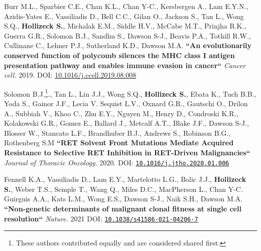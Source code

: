 {Burr M.L., Sparbier C.E., Chan K.L., Chan Y-C., Kersbergen A., Lam E.Y.N., Azidis-Yates E., Vassiliadis D., Bell C.C., Gilan O., Jackson S., Tan L., Wong S.Q., \textbf{Hollizeck S.}, Michalak E.M., Siddle H.V.,  McCabe M.T., Prinjha R.K., Guerra G.R., Solomon B.J., Sandhu S.,  Dawson S-J., Beavis P.A., Tothill R.W., Cullinane C., Lehner P.J., Sutherland K.D., Dawson M.A. \textbf{``An evolutionarily conserved function of polycomb silences the MHC class I antigen presentation pathway and enables immune evasion in cancer``} \textit{Cancer cell.} 2019. DOI: \href{https://doi.org/10.1016/j.ccell.2019.08.008}{10.1016/j.ccell.2019.08.008}

Solomon B.J.\footnote{These authors contributed equally and are considered shared first.}., Tan L.\footnotemark[\value{footnote}], Lin J.J.\footnotemark[\value{footnote}], Wong S.Q.\footnotemark[\value{footnote}], \textbf{Hollizeck S.}\footnotemark[\value{footnote}], Ebata K., Tuch B.B., Yoda S., Gainor J.F., Lecia V. Sequist L.V., Oxnard G.R., Gautschi O., Drilon A., Subbiah V., Khoo C., Zhu E.Y., Nguyen M., Henry D., Condroski K.R., Kolakowski G.R., Gomez E., Ballard J., Metcalf A.T., Blake J.F., Dawson S-J., Blosser W., Stancato L.F., Brandhuber B.J., Andrews S., Robinson B.G., Rothenberg S.M
\textbf{``RET Solvent Front Mutations Mediate Acquired Resistance to Selective RET Inhibition in RET-Driven Malignancies``}
\textit{Journal of Thoracic Oncology.} 2020. DOI: \href{https://doi.org/10.1016/j.jtho.2020.01.006}{\nolinkurl{10.1016/j.jtho.2020.01.006}}

Fennell K.A.\footnotemark[\value{footnote}], Vassiliadis D.\footnotemark[\value{footnote}], Lam E.Y., Martelotto L.G., Balic J.J., \textbf{Hollizeck S.}, Weber T.S., Semple T., Wang Q., Miles D.C., MacPherson L., Chan Y-C. Guirguis A.A., Kats L.M., Wong E.S., Dawson S-J., Naik S.H., Dawson M.A. \textbf{``Non-genetic determinants of malignant clonal fitness at single cell resolution``} \textit{Nature.} 2021 DOI: \href{https://doi.org/10.1038/s41586-021-04206-7}{\nolinkurl{10.1038/s41586-021-04206-7}}





}
